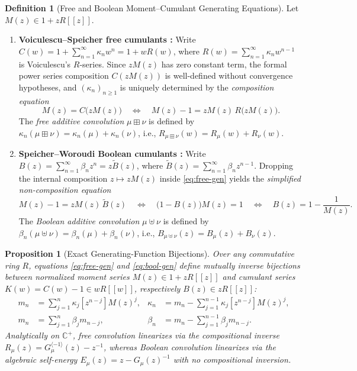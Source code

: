\documentclass[11pt,a4paper]{article}
\newtheorem{proposition}[theorem]{Proposition}
\theoremstyle{definition}
\newtheorem{definition}[theorem]{Definition}
\theoremstyle{remark}
\begin{document}
\begin{definition}[Free and Boolean Moment--Cumulant Generating Equations]
Let $M(z) \in 1 + z R[[z]]$.
\begin{enumerate}
  \item[(a)] \textbf{Voiculescu--Speicher free cumulants \cite{Voiculescu1986,Speicher1994}:} Write $C(w) = 1 + \sum_{n=1}^{\infty} \kappa_n w^n = 1 + w R(w)$, where $R(w) = \sum_{n=1}^{\infty} \kappa_n w^{n-1}$ is Voiculescu's $R$-series. Since $z M(z)$ has zero constant term, the formal power series composition $C(z M(z))$ is well-defined without convergence hypotheses, and $(\kappa_n)_{n \ge 1}$ is uniquely determined by the \emph{composition equation}
  \begin{equation}\label{eq:free-gen}
    M(z) = C\bigl(z M(z)\bigr) \quad \Longleftrightarrow \quad M(z) - 1 = z M(z) \, R\bigl(z M(z)\bigr).
  \end{equation}
  The \emph{free additive convolution} $\mu \boxplus \nu$ is defined by $\kappa_n(\mu \boxplus \nu) = \kappa_n(\mu) + \kappa_n(\nu)$, i.e., $R_{\mu \boxplus \nu}(w) = R_\mu(w) + R_\nu(w)$.
  \item[(b)] \textbf{Speicher--Woroudi Boolean cumulants \cite{SpeicherWoroudi1997}:} Write $B(z) = \sum_{n=1}^{\infty} \beta_n z^n = z \tilde{B}(z)$, where $\tilde{B}(z) = \sum_{n=1}^{\infty} \beta_n z^{n-1}$. Dropping the internal composition $z \mapsto z M(z)$ inside \eqref{eq:free-gen} yields the \emph{simplified non-composition equation}
  \begin{equation}\label{eq:bool-gen}
    M(z) - 1 = z M(z) \, \tilde{B}(z) \quad \Longleftrightarrow \quad \bigl(1 - B(z)\bigr) M(z) = 1 \quad \Longleftrightarrow \quad B(z) = 1 - \frac{1}{M(z)}.
  \end{equation}
  The \emph{Boolean additive convolution} $\mu \uplus \nu$ is defined by $\beta_n(\mu \uplus \nu) = \beta_n(\mu) + \beta_n(\nu)$, i.e., $B_{\mu \uplus \nu}(z) = B_\mu(z) + B_\nu(z)$.
\end{enumerate}
\end{definition}

\begin{proposition}[Exact Generating-Function Bijections]\label{prop:gen-bijections}
Over any commutative ring $R$, equations \eqref{eq:free-gen} and \eqref{eq:bool-gen} define mutually inverse bijections between normalized moment series $M(z) \in 1 + z R[[z]]$ and cumulant series $K(w) = C(w) - 1 \in w R[[w]]$, respectively $B(z) \in z R[[z]]$:
\begin{align}
  m_n &= \sum_{j=1}^{n} \kappa_j [z^{n-j}] M(z)^j, & \kappa_n &= m_n - \sum_{j=1}^{n-1} \kappa_j [z^{n-j}] M(z)^j, \label{eq:rec-free}\\
  m_n &= \sum_{j=1}^{n} \beta_j m_{n-j}, & \beta_n &= m_n - \sum_{j=1}^{n-1} \beta_j m_{n-j}. \label{eq:rec-bool}
\end{align}
Analytically on $\mathbb{C}^+$, free convolution linearizes via the compositional inverse $R_\mu(z) = G_\mu^{\langle -1 \rangle}(z) - z^{-1}$, whereas Boolean convolution linearizes via the algebraic self-energy $E_\mu(z) = z - G_\mu(z)^{-1}$ with no compositional inversion.
\end{proposition}
\end{document}
